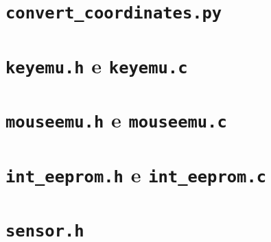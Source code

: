 \documentclass[brazil,pagestart=firstchapter]{abnt}
\begin{document}









\apendice


\chapter{\texttt{convert\_coordinates.py}}
\label{ape:convert_coordinates}


\chapter{\texttt{keyemu.h} e \texttt{keyemu.c}}
\label{ape:keyemu}

\clearpage



\chapter{\texttt{mouseemu.h} e \texttt{mouseemu.c}}
\label{ape:mouseemu}

\clearpage



\chapter{\texttt{int\_eeprom.h} e \texttt{int\_eeprom.c}}
\label{ape:int_eeprom}




\chapter{\texttt{sensor.h}}
\label{ape:sensor}

%
\end{document}
